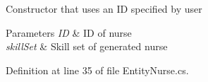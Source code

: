 Constructor that uses an ID specified by user 


\begin{DoxyParams}{Parameters}
{\em ID} & ID of nurse\\
\hline
{\em skill\+Set} & Skill set of generated nurse\\
\hline
\end{DoxyParams}


Definition at line 35 of file Entity\+Nurse.\+cs.

